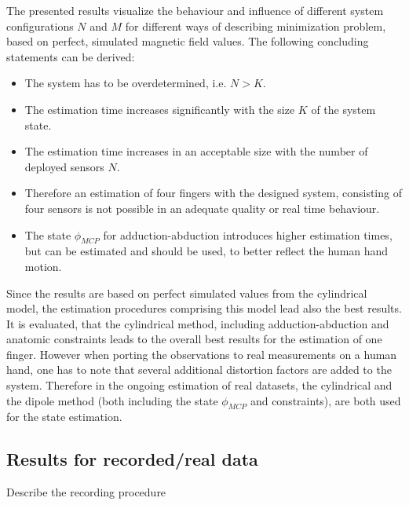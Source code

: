 The presented results visualize the behaviour and influence of different system configurations $ N $ and $ M $ for different ways of describing minimization problem, based on perfect, simulated magnetic field values. The following concluding statements can be derived:
\begin{itemize}
\item The system has to be overdetermined, i.e. $ N > K $.
\item The estimation time increases significantly with the size $ K $ of the system state.
\item The estimation time increases in an acceptable size with the number of deployed sensors $ N $.
\item Therefore an estimation of four fingers with the designed system, consisting of four sensors is not possible in an adequate quality or real time behaviour.
\item The state $ \phi_{MCP} $ for adduction-abduction introduces higher estimation times, but can be estimated and should be used, to better reflect the human hand motion.
\end{itemize}
Since the results are based on perfect simulated values from the cylindrical model, the estimation procedures comprising this model lead also the best results. It is evaluated, that the cylindrical method, including adduction-abduction and anatomic constraints leads to the overall best results for the estimation of one finger. However when porting the observations to real measurements on a human hand, one has to note that several additional distortion factors are added to the system. Therefore in the ongoing estimation of real datasets, the cylindrical and the dipole method (both including the state $ \phi_{MCP} $ and constraints), are both used for the state estimation.





\subsection{Results for recorded/real data} \label{subsec:resMeas}

Describe the recording procedure

